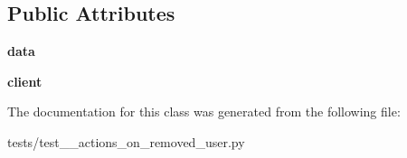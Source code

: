 \subsection*{Public Attributes}
\begin{DoxyCompactItemize}
\item 
\mbox{\label{classtests_1_1test__13__actions__on__removed__user_1_1_test_user_routes_aeefb5f93b8f194f5c8695a8a8c77769a}} 
{\bfseries data}
\item 
\mbox{\label{classtests_1_1test__13__actions__on__removed__user_1_1_test_user_routes_a18d3632ffd5596b3a1f7af60494dba91}} 
{\bfseries client}
\end{DoxyCompactItemize}


The documentation for this class was generated from the following file\+:\begin{DoxyCompactItemize}
\item 
tests/test\+\_\+\_\+actions\+\_\+on\+\_\+removed\+\_\+user.\+py\end{DoxyCompactItemize}
